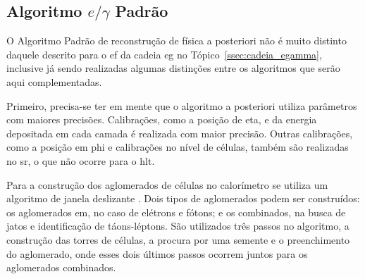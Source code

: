 \subsection{\texorpdfstring{Algoritmo $e/\gamma$ Padrão}{Algoritmo eGamma Padrão}}
\label{ssec:egamma}

O Algoritmo Padrão de reconstrução de física a posteriori não é muito distinto
daquele descrito para o \gls{ef} da cadeia \gls{eg} no Tópico~\ref{ssec:cadeia_egamma},
inclusive já sendo realizadas algumas distinções entre os algoritmos que serão
aqui complementadas.

Primeiro, precisa-se ter em mente que o algoritmo a posteriori utiliza
parâmetros com maiores precisões. Calibrações, como a posição de \gls{eta}, e 
da energia depositada em cada camada é realizada com maior precisão. Outras
calibrações, como a posição em \gls{phi} e calibrações no nível de células,
também são realizadas no \gls{sr}, o que não ocorre para o \gls{hlt}.

Para a construção dos aglomerados de células no calorímetro se utiliza um algoritmo 
de janela deslizante \cite{sliding_window}.
Dois tipos de aglomerados podem ser construídos: os aglomerados \gls{em}, no caso de elétrons e fótons; 
e os combinados, na busca de jatos e identificação de
táons-léptons. São utilizados três passos no algoritmo, a construção das torres de
células, a procura por uma semente e o preenchimento do aglomerado, onde esses dois
últimos passos ocorrem juntos para os aglomerados combinados. 

